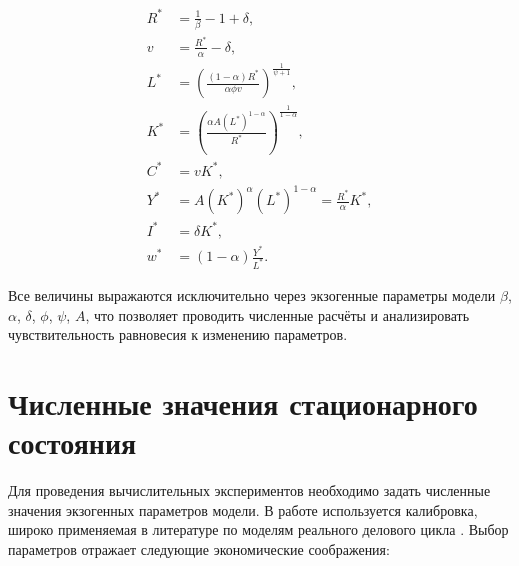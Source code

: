\documentclass[12pt,a4paper]{report}   %
\begin{document}
            \[
            \begin{aligned}
            R^* &= \frac{1}{\beta} - 1 + \delta, \\[4pt]
            v &= \frac{R^*}{\alpha} - \delta, \\[4pt]
            L^* &= \left( \frac{(1-\alpha)R^*}{\alpha \phi v} \right)^{\frac{1}{\psi+1}}, \\[4pt]
            K^* &= \left( \frac{\alpha A (L^*)^{1-\alpha}}{R^*} \right)^{\frac{1}{1-\alpha}}, \\[4pt]
            C^* &= v K^*, \\[4pt]
            Y^* &= A (K^*)^{\alpha} (L^*)^{1-\alpha} = \frac{R^*}{\alpha} K^*, \\[4pt]
            I^* &= \delta K^*, \\[4pt]
            w^* &= (1-\alpha)\frac{Y^*}{L^*}.
            \end{aligned}
            \]

            Все величины выражаются исключительно через экзогенные параметры модели $\beta$, $\alpha$, $\delta$, $\phi$, $\psi$, $A$, что позволяет проводить численные расчёты и анализировать чувствительность равновесия к изменению параметров.
            
        \section{Численные значения стационарного состояния}

            Для проведения вычислительных экспериментов необходимо задать численные значения экзогенных параметров модели. В работе используется калибровка, широко применяемая в литературе по моделям реального делового цикла \cite{kingrebello, cooley}. Выбор параметров отражает следующие экономические соображения:
\end{document}
